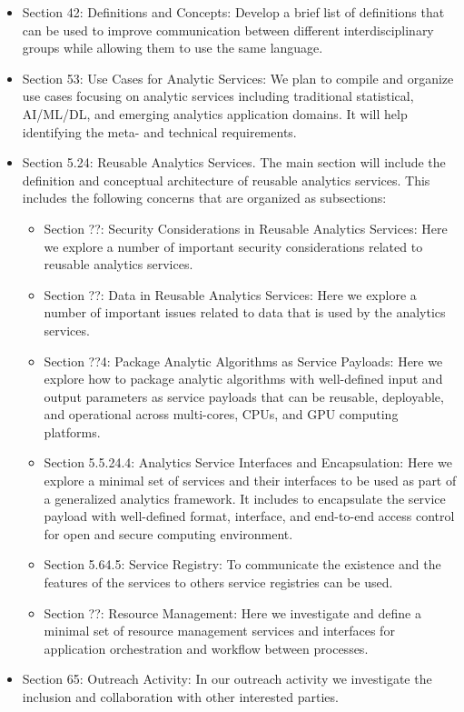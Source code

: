 \begin{itemize}
    \item Section 42: Definitions and Concepts: Develop a brief list of definitions that can be used to improve communication between different interdisciplinary groups while allowing them to use the same language.

\item Section 53: Use Cases for Analytic Services: We plan to compile and organize use cases focusing on analytic services including traditional statistical, AI/ML/DL, and emerging analytics application domains. It will help identifying the meta- and technical requirements.

\item Section 5.24: Reusable Analytics Services. The main section will include the definition and conceptual architecture of reusable analytics services. This includes the following concerns that are organized as subsections: 
  
  \begin{itemize}
  \item Section ??: Security Considerations in Reusable Analytics Services: Here we explore a number of important security considerations related to reusable analytics services.

  \item Section ??: Data in Reusable Analytics Services: Here we explore a number of important issues  related to data that is used by the analytics services.

  \item Section  ??4: Package Analytic Algorithms as Service Payloads: Here we explore how to package analytic algorithms with well-defined input and output parameters as service payloads that can be reusable, deployable, and operational across multi-cores, CPUs, and GPU computing platforms.

  \item Section 5.5.24.4: Analytics Service Interfaces and Encapsulation: Here we explore a minimal set of services and their interfaces to be used as part of a generalized analytics framework. It includes to encapsulate the service payload with well-defined format, interface, and end-to-end access control for open and secure computing environment.
  
  \item Section 5.64.5: Service Registry: To communicate the existence and the features of the services to others service registries can be used.

  \item Section ??: Resource Management: Here we investigate and define a minimal set of resource management services and interfaces for application orchestration and workflow between processes.

  \end{itemize}

\item Section 65: Outreach Activity: In our outreach activity we investigate the inclusion and collaboration with other interested parties.

\end{itemize}

